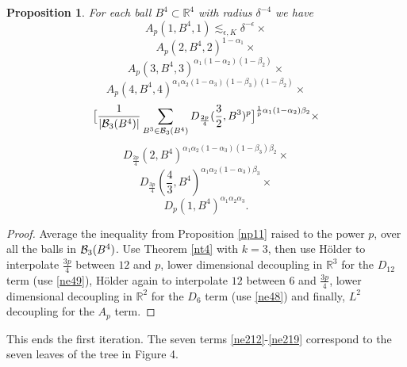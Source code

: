 \documentclass[amssymb,amsfonts,12pt]{amsart}
\newtheorem{proposition}[theorem]{Proposition}
\def\R{{\mathbb R}}
\begin{document}
\begin{proposition}
\label{np12}
For each ball $B^4\subset \R^4$ with radius $\delta^{-4}$ we have
$$A_p(1,B^4,1)\lesssim_{\epsilon,K}\delta^{-\epsilon}\times$$
\begin{equation}\label{ne212}
A_p(2,B^4,2)^{1-\alpha_1}\times\end{equation}\begin{equation}
\label{ne214}A_p(3,B^4,3)^{\alpha_1(1-\alpha_2)(1-\beta_2)}\times\end{equation}\begin{equation}
\label{ne216}A_p(4,B^4,4)^{\alpha_1\alpha_2(1-\alpha_3)(1-\beta_3)(1-\beta_2)}\times
\end{equation}\begin{equation}
\label{ne215}\big[\frac{1}{|{\mathcal B}_3(B^4)|}\sum_{B^3\in{\mathcal B}_3(B^4)}D_{\frac{2p}{4}}(\frac32,B^3)^p\big]^{\frac1{p}\alpha_1(1-\alpha_2)\beta_2}\times\end{equation}
\begin{equation}
\label{ne217}D_{\frac{2p}{4}}(2,B^4)^{\alpha_1\alpha_2(1-\alpha_3)(1-\beta_3)\beta_2}\times
\end{equation}
\begin{equation}
\label{ne218}D_{\frac{3p}{4}}(\frac43,B^4)^{\alpha_1\alpha_2(1-\alpha_3)\beta_3}\times
\end{equation}
\begin{equation}
\label{ne219}D_p(1,B^4)^{\alpha_1\alpha_2\alpha_3}.
\end{equation}
\end{proposition}
\begin{proof}
Average the inequality from  Proposition \ref{np11} raised to the power $p$, over all the balls in  ${\mathcal B}_3(B^4)$.
Use Theorem \ref{nt4} with $k=3$, then use H\"older to interpolate $\frac{3p}{4}$ between $12$ and $p$, lower dimensional decoupling in $\R^3$ for the $D_{12}$ term (use \eqref{ne49}), H\"older again to interpolate $12$ between 6 and $\frac{3p}4$, lower dimensional decoupling  in $\R^2$ for the $D_6$ term (use \eqref{ne48}) and finally, $L^2$ decoupling for the $A_p$ term.

\end{proof}
This ends the first iteration. The seven terms  \eqref{ne212}-\eqref{ne219} correspond to the seven leaves of the tree in Figure 4.
\end{document}
